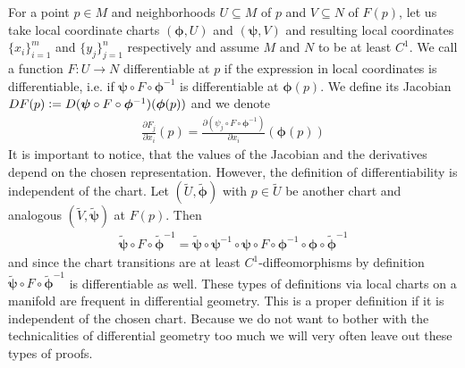 \documentclass[../master_thesis.tex]{subfiles}
\begin{document}
For a point $p \in M$ and neighborhoods $U \subseteq M$ of $p$ and 
$V \subseteq N$ of $F(p)$, let us take local coordinate charts 
$(\boldsymbol{\phi}, U)$ and $(\boldsymbol{\psi}, V)$  and resulting local coordinates 
$\{x_i\}_{i=1}^m$ and $\{ y_j\}_{j=1}^n$ respectively and assume 
$M$ and $N$ to be at least $C^1$. We call a function 
$F: U \rightarrow N$ differentiable at $p$ if the expression in local coordinates
is differentiable, i.e. if 
$\boldsymbol{\psi} \circ F \circ \boldsymbol{\phi}^{-1}$ is differentiable
at $\boldsymbol{\phi}(p)$.
We define its Jacobian $DF(p) \vcentcolon= D(\boldsymbol{\psi} \circ F \circ 
\boldsymbol{\phi}^{-1})(\boldsymbol{\phi}(p))$ 
and we denote 
\begin{align}
    \frac{\partial F_j}{\partial x_i}(p) 
    = \frac{\partial (\psi_j \circ F \circ \boldsymbol{\phi}^{-1})}{\partial x_i} (\boldsymbol{\phi}(p))
    \label{eq:derivative_on_manifold} 
\end{align}
It is important to notice, that the values of the Jacobian 
and the derivatives depend on the chosen representation.
However, the definition of differentiability is independent of the chart. 
Let $(\tilde{U},\tilde{\boldsymbol{\phi}})$ with $p \in \tilde{U}$ be 
another chart and analogous $(\tilde{V},\tilde{\boldsymbol{\psi}})$ 
at $F(p)$.
Then 
\begin{align*}
    \tilde{\boldsymbol{\psi}} \circ F \circ \tilde{\boldsymbol{\phi}}^{-1} 
    = \tilde{\boldsymbol{\psi}} \circ \bm{\psi}^{-1} \circ \bm{\psi} \circ F \circ \bm{\phi}^{-1} 
        \circ \bm{\phi} \circ \tilde{\boldsymbol{\phi}}^{-1}
\end{align*}
and since the chart transitions are at least $C^1$-diffeomorphisms by definition
$\tilde{\boldsymbol{\psi}} \circ F \circ \tilde{\boldsymbol{\phi}}^{-1} $ is differentiable as well.
These types of definitions via local charts on a manifold are frequent in
differential geometry. This is a proper definition if it is independent of the 
chosen chart. Because we do not want to bother with the technicalities of 
differential geometry too much we will very often leave out these types of
proofs. 
\end{document}
